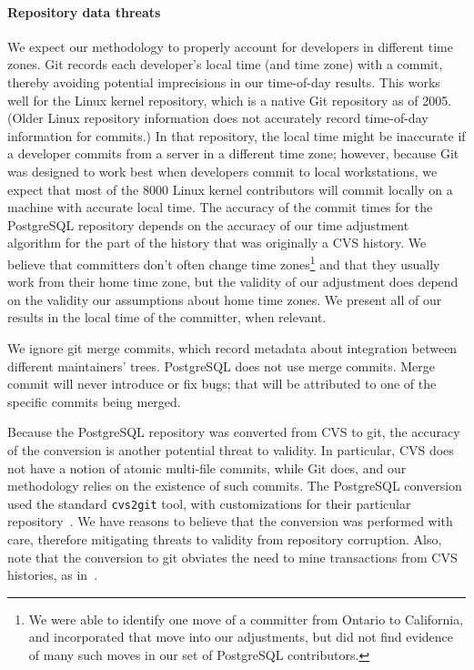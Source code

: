\paragraph{Repository data threats}
We expect our methodology to properly account for developers in
different time zones. Git records each developer's local time (and
time zone) with a commit, thereby avoiding potential imprecisions in
our time-of-day results. This works well for the Linux kernel repository,
which is a native Git repository as of 2005. (Older Linux repository
information does not accurately record time-of-day information for
commits.) In that repository, the
local time might be inaccurate if a developer commits from a server in
a different time zone; however, because Git was designed to work best
when developers commit to local workstations, 
we expect that most of the 8000 Linux kernel
contributors will commit locally on a machine with accurate local
time.  The accuracy of the commit times for the PostgreSQL repository
depends on the accuracy of our time adjustment algorithm for the part
of the history that was originally a CVS history. We believe that
committers don't often change time zones\footnote{We were able to identify
one move of a committer from Ontario to California, and incorporated that
move into our adjustments, but did not find evidence of many such moves
in our set of PostgreSQL contributors.} and that they usually work from their
home time zone, but the validity of our adjustment does depend on the
validity our assumptions about home time zones. We present all of our
results in the local time of the committer, when relevant.

We ignore git merge commits, which record metadata about 
integration between different maintainers' trees. PostgreSQL does not
use merge commits. Merge commit will never introduce or fix bugs; that
will be attributed to one of the specific commits being merged.

Because the PostgreSQL repository was converted from CVS to git, the
accuracy of the conversion is another potential threat to validity.  In
particular, CVS does not have a notion of atomic multi-file commits,
while Git does, and our methodology relies on the existence of such
commits. The PostgreSQL conversion used the standard {\tt cvs2git} tool,
with customizations for their particular
repository~\cite{haas09:_so_why_postg_using_git}. We have reasons to
believe that the conversion was performed with care, therefore
mitigating threats to validity from repository corruption. 
Also, note that the conversion to git obviates the need to mine transactions
from CVS histories, as in~\cite{zimmermann-msr-2004}.

